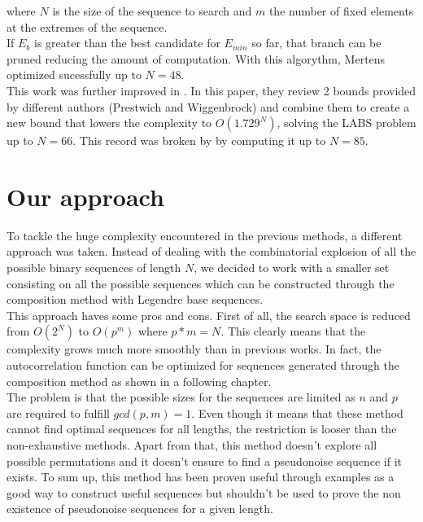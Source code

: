   where $N$ is the size of the sequence to search and $m$ the number of fixed
  elements at the extremes of the sequence.\\

  If $E_b$ is greater than the best candidate for $E_{min}$ so far, that branch
  can be pruned reducing the amount of computation. With this algorythm,
  Mertens optimized sucessfully up to $N = 48$.\\

  This work was further improved in \citet{Packebusch_2016}. In this paper,
  they review 2 bounds provided by different authors (Prestwich and
  Wiggenbrock) and combine them to create a new bound that lowers the
  complexity to $O(1.729^N)$, solving the LABS problem up to $N = 66$. This
  record was broken by \citet{anatoli} by computing it up to $N = 85$.\\

  \section{Our approach}

  To tackle the huge complexity encountered in the previous methods, a different
  approach was taken. Instead of dealing with the combinatorial explosion
  of all the possible binary sequences of length $N$, we decided to work with
  a smaller set consisting on all the possible sequences which can be
  constructed through the composition method with Legendre base sequences.\\

  This approach haves some pros and cons. First of all, the search space is
  reduced from $O(2^N)$ to $O(p^m)$ where $p*m = N$. This clearly means that
  the complexity grows much more smoothly than in previous works. In fact, the
  autocorrelation function can be optimized for sequences generated through the
  composition method as shown in a following chapter.\\

  The problem is that the possible sizes for the sequences are limited as $n$
  and $p$ are required to fulfill $gcd(p, m) = 1$. Even though it means that
  these method cannot find optimal sequences for all lengths, the restriction is
  looser than the non-exhaustive methods. Apart from that, this method doesn't
  explore all possible permutations and it doesn't ensure to find a pseudonoise
  sequence if it exists. To sum up, this method has been proven useful
  through examples as a good way to construct useful sequences but shouldn't
  be used to prove the non existence of pseudonoise sequences for a given
  length.\\

